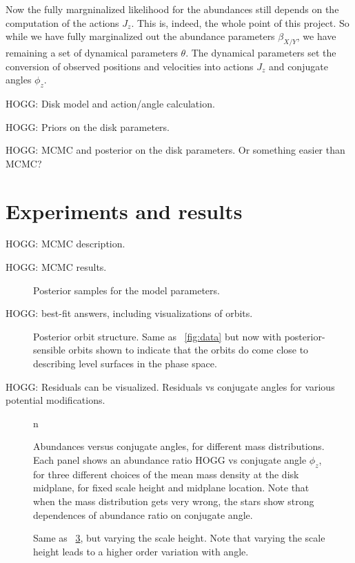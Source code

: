 \documentclass[modern]{aastex62}
\begin{document}
Now the fully margninalized likelihood for the abundances still depends on the computation
of the actions $J_z$. This is, indeed, the whole point of this project.
So while we have fully marginalized out the abundance parameters $\beta_{X/Y}$, we have
remaining a set of dynamical parameters $\theta$.
The dynamical parameters set the conversion of observed positions and velocities into actions $J_z$
and conjugate angles $\phi_z$.

HOGG: Disk model and action/angle calculation.

HOGG: Priors on the disk parameters.

HOGG: MCMC and posterior on the disk parameters. Or something easier than MCMC?

\section{Experiments and results}

HOGG: MCMC description.

HOGG: MCMC results.
\begin{figure}
\caption{Posterior samples for the model parameters.\label{fig:samples}}
\end{figure}

HOGG: best-fit answers, including visualizations of orbits.
\begin{figure}
\caption{Posterior orbit structure. Same as \figurename~\ref{fig:data} but now with
posterior-sensible orbits shown to indicate that the orbits do come close to describing
level surfaces in the phase space.\label{fig:orbits}}
\end{figure}

HOGG: Residuals can be visualized. Residuals vs conjugate angles for various potential modifications.

\begin{figure}
n\caption{Abundances versus conjugate angles, for different mass distributions.
Each panel shows an abundance ratio HOGG vs conjugate angle $\phi_z$, for three different
choices of the mean mass density at the disk midplane, for fixed scale height and midplane
location. Note that when the mass distribution gets very wrong, the stars show strong
dependences of abundance ratio on conjugate angle.\label{fig:density}}
\end{figure}

\begin{figure}
\caption{Same as \figurename~\ref{fig:density}, but varying the scale height. Note that
varying the scale height leads to a higher order variation with angle.\label{fig:scaleheight}}
\end{figure}
\end{document}
